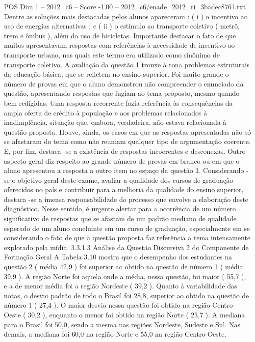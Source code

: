 \begin{textsample}{POS Dim 1 – 2012\_c6 – Score -1.00 – 2012\_c6/enade\_2012\_ri\_3badec8761.txt}
Dentre as soluções mais destacadas pelos alunos apareceram : ( i ) o incentivo ao uso de energias alternativas ; e ( ii ) o estímulo ao transporte coletivo ( metrô, trem e ônibus ), além do uso de bicicletas.
Importante destacar o fato de que muitos apresentavam respostas com referências à necessidade de incentivo ao transporte urbano, nas quais este termo era utilizado como sinônimo de transporte coletivo.
A avaliação da questão 1 trouxe à tona problemas estruturais da educação básica, que se refletem no ensino superior.
Foi muito grande o número de provas em que o aluno demonstrou não compreender o enunciado da questão, apresentando respostas que fugiam ao tema proposto, mesmo quando bem redigidas.
Uma resposta recorrente fazia referência às consequências da ampla oferta de crédito à população e aos problemas relacionados à inadimplência, situação que, embora, verdadeira, não estava relacionada à questão proposta.
Houve, ainda, os casos em que as respostas apresentadas não só se afastaram do tema como não reuniam qualquer tipo de argumentação coerente.
E, por fim, destaca -se a existência de respostas incoerentes e desconexas.
Outro aspecto geral diz respeito ao grande número de provas em branco ou em que o aluno apresentou a resposta a outro item no espaço da questão 1.
Considerando -se o objetivo geral deste exame, avaliar a qualidade dos cursos de graduação oferecidos no país e contribuir para a melhoria da qualidade do ensino superior, destaca -se a imensa responsabilidade do processo que envolve a elaboração deste diagnóstico.
Nesse sentido, é urgente alertar para a ocorrência de um número significativo de respostas que se afastam de um padrão mediano de qualidade esperado de um aluno concluinte em um curso de graduação, especialmente em se considerando o fato de que a questão proposta faz referência a tema intensamente explorado pela mídia. 3.3.1.3 Análise da Questão Discursiva 2 do Componente de Formação Geral A Tabela 3.10 mostra que o desempenho dos estudantes na questão 2 ( média 42,9 ) foi superior ao obtido na questão de número 1 ( média 39,9 ).
A região Norte foi aquela onde a média, nessa questão, foi maior ( 55,7 ), e a de menor média foi a região Nordeste ( 39,2 ).
Quanto à variabilidade das notas, o desvio padrão de todo o Brasil foi 28,8, superior ao obtido na questão de número 1 ( 27,4 ).
O maior desvio nessa questão foi obtido na região Centro-Oeste ( 30,2 ), enquanto o menor foi obtido na região Norte ( 23,7 ).
A mediana para o Brasil foi 50,0, sendo a mesma nas regiões Nordeste, Sudeste e Sul.
Nas demais, a mediana foi 60,0 na região Norte e 55,0 na região Centro-Oeste.

\end{textsample}
